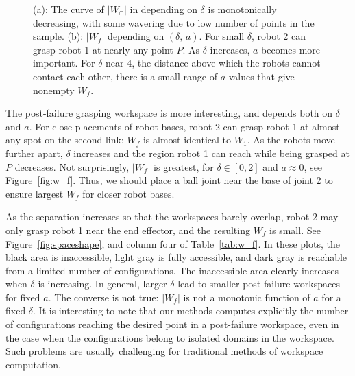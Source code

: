 \documentclass[12pt]{report}
\begin{document}
\begin{figure}[t]
\begin{center}
\caption{{\small (a): The curve of $|W_\cap|$ in depending on $\delta$ is monotonically decreasing, with some wavering due to low number of points in the sample.  (b):  $|W_f|$ depending on $(\delta,\, a)$.  For small $\delta$,  robot 2 can grasp robot 1 at nearly any point $P$.  As $\delta$ increases, $a$ becomes more important.  For $\delta$ near 4, the distance above which the robots cannot contact each other, there is a small range of $a$ values that give nonempty $W_f$. } }
\end{center}
\end{figure}

The post-failure grasping workspace is more interesting, and depends both on $\delta$ and $a$.  For close placements of robot bases, robot 2 can grasp robot 1 at almost any spot on the second link; $W_f$ is almost identical to $W_1$.  As the robots move further apart,  $\delta$ increases and the region robot 1 can reach while being grasped at $P$ decreases.  Not surprisingly, $|W_f|$ is greatest, for $\delta \in [0 , 2]$ and $a \approx 0$, see Figure~\ref{fig:w_f}.  Thus, we should place a ball joint near the base of joint 2 to ensure largest $W_f$ for closer robot bases.  

As the separation increases so that the workspaces barely overlap, robot 2 may only grasp robot 1 near the end effector, and the resulting $W_f$ is small.    See Figure~\ref{fig:spaceshape}, and column four of  Table~\ref{tab:w_f}.  In these plots, the black area is inaccessible, light gray is fully accessible, and dark gray is reachable from a limited number of configurations.  The inaccessible area clearly increases when $\delta$ is increasing. In general, larger $\delta$ lead to smaller post-failure workspaces for fixed $a$. The converse is not true: $|W_f|$ is not a monotonic function of $a$ for a fixed $\delta$. 
 It is interesting to note that our methods computes explicitly the number of configurations reaching the desired point in a post-failure workspace, even in the case when the configurations belong to isolated domains in the workspace. Such problems are usually challenging for traditional methods of workspace computation. 
\end{document}
